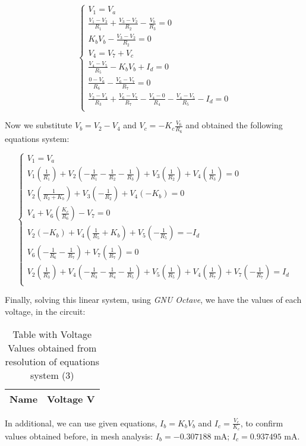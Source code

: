 \begin{equation}
\begin{cases}
V_1=V_a\\
\frac{V_1-V_2}{R_1} + \frac{V_3-V_2}{R_2} - \frac{V_b}{R_3}=0\\
K_bV_b - \frac{V_3-V_2}{R_2}=0\\
V_4= V_7+V_c\\

\frac{V_4-V_5}{R_5} - K_bV_b + I_d=0\\

\frac{0-V_6}{R_6} - \frac{V_6-V_7}{R_7} = 0\\
\frac{V_2-V_4}{R_3} + \frac{V_6-V_7}{R_7} - \frac{V_4-0}{R_4}-\frac{V_4-V_5}{R_5}-I_d=0\\
\end{cases}
\end{equation}

Now we substitute $V_b=V_2-V_4$ and $V_c=-K_c\frac{V_6}{R_6}$ and obtained the following equations system:

\begin{equation}
\begin{cases}
V_1=V_a\\
V_1(\frac{1}{R_1})+V_2(-\frac{1}{R_1}-\frac{1}{R_2}-\frac{1}{R_3})+V_3(\frac{1}{R_2})+V_4(\frac{1}{R_3})=0\\
V_2(\frac{1}{R_2+K_b})+V_3(-\frac{1}{R_2})+V_4(-K_b)=0\\
V_4+ V_6(\frac{K_c}{R_6})- V_7= 0\\
V_2(-K_b)+V_4(\frac{1}{R_5}+K_b)+V_5(-\frac{1}{R_5})= -I_d\\
V_6(-\frac{1}{R_6}-\frac{1}{R_7})+V_7(\frac{1}{R_7})= 0\\
V_2(\frac{1}{R_3})+V_4(-\frac{1}{R_3}-\frac{1}{R_4}-\frac{1}{R_5})+V_5(\frac{1}{R_5})+V_4(\frac{1}{R_7})+V_7(-\frac{1}{R_7})=I_d\\
\end{cases}
\end{equation}

Finally, solving this linear system, using \textit{GNU Octave}, we have the values of each voltage, in the circuit:

\begin{table}[h]
  \centering
  \begin{tabular}{|l|r|}
    \hline    
    {\bf Name} & {\bf Voltage V} \\ \hline
    
 \end{tabular}
 \caption{Table with Voltage Values obtained from resolution of equations system (3)}
  \label{tab:op}
\end{table}

In additional, we can use given equations, $I_b=K_bV_b$ and $I_c=\frac{V_c}{K_c}$, to confirm values obtained before, in mesh analysis: $I_b=-0.307188$ mA; $I_c=0.937495$ mA.






